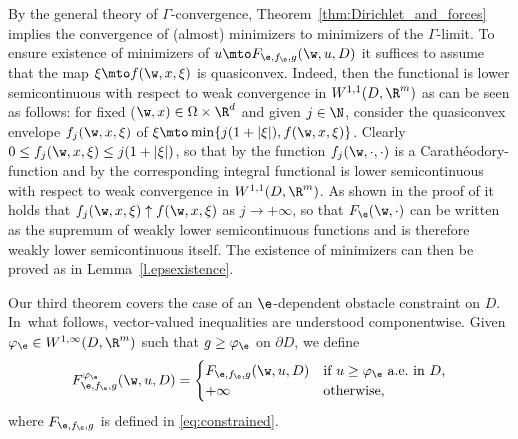 \begin{remark}\label{r.existence}
By the general theory of $\Gamma$-convergence, Theorem~\ref{thm:Dirichlet_and_forces} implies the convergence of (almost) minimizers to minimizers of the $\Gamma$-limit. To ensure existence of minimizers of $u\mto F_{\e,f_{\e},g}(\w,u,D)$ it suffices to assume that the map $\xi\mto f(\w,x,\xi)$ is quasiconvex. Indeed, then the functional is lower semicontinuous with respect to weak convergence in $W^{1,1}(D,\R^m)$ as can be seen as follows: for fixed ($\w,x)\in\Omega\times\R^d$ and given $j\in\N$, consider the quasiconvex envelope $f_j(\w,x,\xi)$ of $\xi\mto\min\{j(1+|\xi|),f(\w,x,\xi)\}$. Clearly $0\leq f_j(\w,x,\xi)\leq j(1+|\xi|)$, so that by \cite[Prop.\,9.5]{Da} the function $f_j(\w,\cdot,\cdot)$ is a Carathéodory-function and by \cite[Th.\,8.11]{Da} the corresponding integral functional is lower semicontinuous with respect to weak convergence in $W^{1,1}(D,\R^m)$. As shown in the proof of \cite[Lem.\,4.1]{Kristensen} it holds that $f_j(\w,x,\xi)\uparrow f(\w,x,\xi)$ as $j\to +\infty$, so that $F_{\e}(\w,\cdot)$ can be written as the supremum of weakly lower semicontinuous functions and is therefore weakly lower semicontinuous itself. The existence of minimizers can then be proved as in Lemma~\ref{l.epsexistence}.
\end{remark}
Our third theorem covers the case of an $\e$-dependent obstacle constraint on $D$. In~what follows, vector-valued inequalities are understood componentwise. Given $\varphi_{\e}\in W^{1,\infty}(D,\R^m)$ such that $g\geq\varphi_{\e}$ on $\partial D$, we define
\begin{equation*}
F^{\varphi_{\e}}_{\e,f_{\e},g}(\w,u,D)=
\begin{cases}
F_{\e,f_{\e},g}(\w,u,D) &\mbox{if $u\geq\varphi_{\e}$ a.e.\ in $D$,}
\\
+\infty &\mbox{otherwise,}
\end{cases}
\end{equation*}
where $F_{\e,f_{\e},g}$ is defined in \eqref{eq:constrained}.
